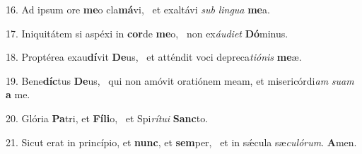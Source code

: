 16. Ad ipsum ore \textbf{me}o cla\textbf{má}vi, \ast\  et exaltávi \textit{sub} \textit{lin}\textit{gua} \textbf{me}a.\

17. Iniquitátem si aspéxi in \textbf{cor}de \textbf{me}o, \ast\  non ex\textit{áu}\textit{di}\textit{et} \textbf{Dó}minus.\

18. Proptérea exau\textbf{dí}vit \textbf{De}us, \ast\  et atténdit voci depreca\textit{ti}\textit{ó}\textit{nis} \textbf{me}æ.\

19. Bene\textbf{díc}tus \textbf{De}us, \ast\  qui non amóvit oratiónem meam, et misericórdi\textit{am} \textit{su}\textit{am} \textbf{a} me.\

20. Glória \textbf{Pa}tri, et \textbf{Fí}\textbf{li}o, \ast\  et Spi\textit{rí}\textit{tu}\textit{i} \textbf{Sanc}to.\

21. Sicut erat in princípio, et \textbf{nunc}, et \textbf{sem}per, \ast\  et in sǽcula sæ\textit{cu}\textit{ló}\textit{rum}. \textbf{A}men.\

